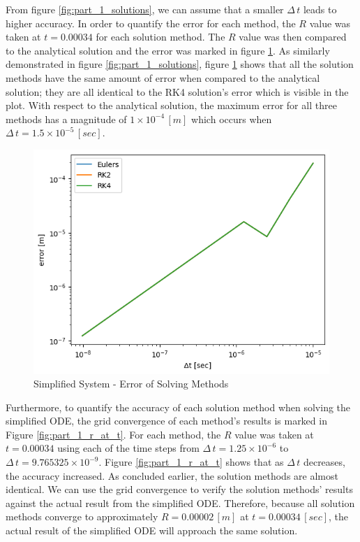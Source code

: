 \documentclass[12pt]{article}
\begin{document}
From figure \ref{fig:part_1_solutions}, we can assume that a smaller $\Delta \, t$ leads to higher accuracy. In order to quantify the error for each method, the $R$ value was taken at $t=0.00034$ for each solution method. The $R$ value was then compared to the analytical solution and the error was marked in figure \ref{fig:part_1_error}. As similarly demonstrated in figure \ref{fig:part_1_solutions}, figure \ref{fig:part_1_error} shows that all the solution methods have the same amount of error when compared to the analytical solution; they are all identical to the RK4 solution's error which is visible in the plot. With respect to the analytical solution, the maximum error for all three methods has a magnitude of $1\times10^{-4}\, [m]$ which occurs when $\Delta\, t = 1.5\times10^{-5} \,[sec]$.

\begin{figure}[H]
    \centering
    \includegraphics[scale=0.75]{out/error/Question_1/error.png}
    \caption{Simplified System - Error of Solving Methods}
    \label{fig:part_1_error}
\end{figure}

Furthermore, to quantify the accuracy of each solution method when solving the simplified ODE, the grid convergence of each method’s results is marked in Figure \ref{fig:part_1_r_at_t}. For each method, the $R$ value was taken at $t = 0.00034$ using each of the time steps from $\Delta\, t = 1.25\times 10^{-6}$ to $\Delta\, t = 9.765325 \times 10^{-9}$. Figure \ref{fig:part_1_r_at_t} shows that as $\Delta\, t$ decreases, the accuracy increased. As concluded earlier, the solution methods are almost identical. We can use the grid convergence to verify the solution methods' results against the actual result from the simplified ODE. Therefore, because all solution methods converge to approximately $R = 0.00002\, [m]$ at $t = 0.00034\, [sec]$, the actual result of the simplified ODE will approach the same solution.
\end{document}
